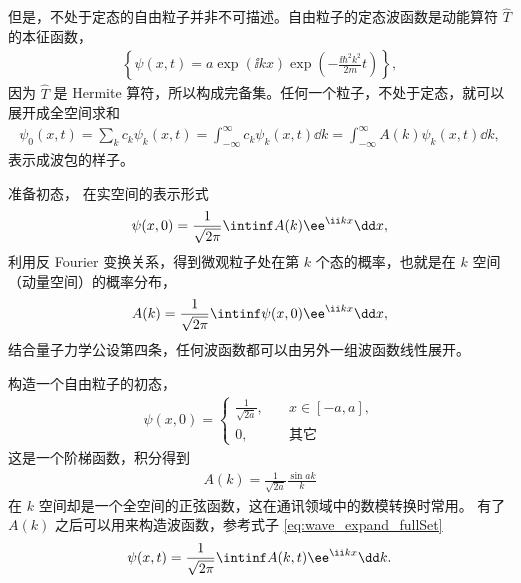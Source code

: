 但是，不处于定态的自由粒子并非不可描述。自由粒子的定态波函数是动能算符 $\hat T$ 的本征函数，
\begin{eqnarray}
    \left\{\psi(x,t) = a \exp (\ii k x) \exp \left( - \frac{\ii\hbar^2k^2}{2m}t\right)
    \right\},
\end{eqnarray}
因为 $\hat T$ 是 Hermite 算符，所以构成完备集。任何一个粒子，不处于定态，就可以展开成全空间求和
\begin{eqnarray}
    \psi_0 (x,t) = \sum_k c_k\psi_k(x,t) = \int_{-\infty}^\infty c_k\psi_k (x,t) \dd k = \int_{-\infty}^\infty A(k) \psi_k(x,t) \dd k, \label{eq:wave_expand_fullSet}
\end{eqnarray}
表示成波包的样子。



准备初态，
在实空间的表示形式
\begin{eqnarray}
    \psi(x,0) = \frac{1}{\sqrt{2\pi}} \intinf A(k) \ee^{\ii kx} \dd x, 
\end{eqnarray}
利用反 Fourier 变换关系，得到微观粒子处在第 $k$ 个态的概率，也就是在 $k$ 空间（动量空间）的概率分布，
\begin{eqnarray}
    A(k) = \frac{1}{\sqrt{2\pi}} \intinf \psi(x,0) \ee^{\ii kx} \dd x,
\end{eqnarray}
结合量子力学公设第四条，任何波函数都可以由另外一组波函数线性展开。

构造一个自由粒子的初态，
\begin{eqnarray}
    \psi(x,0) = 
    \begin{cases}
        \frac1{\sqrt{2a}},\quad &x\in[-a,a],\\
        0, \quad &\text{其它}
    \end{cases}
\end{eqnarray}
这是一个阶梯函数，积分得到
\begin{eqnarray}
    A(k) = \frac1{\sqrt{2a}} \frac{\sin ak}{k}
\end{eqnarray}
在 $k$ 空间却是一个全空间的正弦函数，这在通讯领域中的数模转换时常用。
有了 $A(k)$ 之后可以用来构造波函数，参考式子 \eqref{eq:wave_expand_fullSet}
\begin{eqnarray}
    \psi(x,t) = \frac1{\sqrt{2\pi}} \intinf A(k,t) \ee^{\ii k x} \dd k. 
\end{eqnarray}

